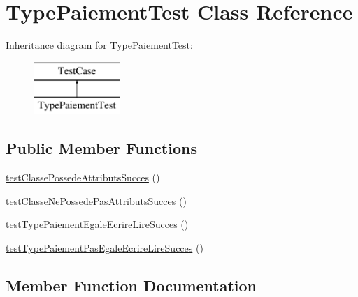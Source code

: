 \hypertarget{class_type_paiement_test}{}\section{Type\+Paiement\+Test Class Reference}
\label{class_type_paiement_test}
Inheritance diagram for Type\+Paiement\+Test\+:\begin{figure}[H]
\begin{center}
\leavevmode
\includegraphics[height=2.000000cm]{class_type_paiement_test}
\end{center}
\end{figure}
\subsection*{Public Member Functions}
\begin{DoxyCompactItemize}
\item 
\hyperlink{class_type_paiement_test_ac963a46f2366b04ff8e5740f024969a5}{test\+Classe\+Possede\+Attributs\+Succes} ()
\item 
\hyperlink{class_type_paiement_test_a904124c1303b3f34b732e940b45cb0ab}{test\+Classe\+Ne\+Possede\+Pas\+Attributs\+Succes} ()
\item 
\hyperlink{class_type_paiement_test_a00878b71b67fa7c3ba02fa5449986dbe}{test\+Type\+Paiement\+Egale\+Ecrire\+Lire\+Succes} ()
\item 
\hyperlink{class_type_paiement_test_a7207d2e5d9d3e400f6b9848d59c32464}{test\+Type\+Paiement\+Pas\+Egale\+Ecrire\+Lire\+Succes} ()
\end{DoxyCompactItemize}


\subsection{Member Function Documentation}
\mbox{\label{class_type_paiement_test_a904124c1303b3f34b732e940b45cb0ab}} 
